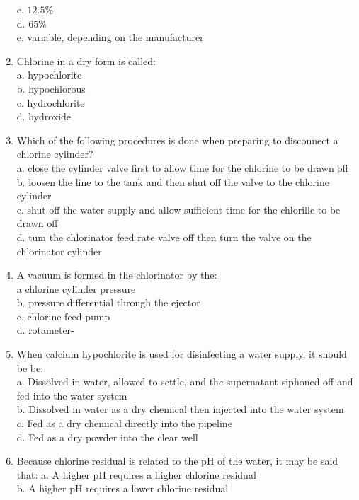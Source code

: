 \begin{enumerate}[1.]
c. $12.5 \%$\\
d. $65 \%$\\
e. variable, depending on the manufacturer\\
\item Chlorine in a dry form is called:\\
a. hypochlorite\\
b. hypochlorous\\
c. hydrochlorite\\
d. hydroxide\\
\item Which of the following procedures is done when preparing to disconnect a chlorine cylinder?\\
a. close the cylinder valve first to allow time for the chlorine to be drawn off\\
b. loosen the line to the tank and then shut off the valve to the chlorine cylinder\\
c. shut off the water supply and allow sufficient time for the chlorille to be drawn off\\
d. tum the chlorinator feed rate valve off then turn the valve on the chlorinator cylinder\\
\item A vacuum is formed in the chlorinator by the:\\
a chlorine cylinder pressure\\
b. pressure differential through the ejector\\
c. chlorine feed pump\\
d. rotameter-\\
\item When calcium hypochlorite is used for disinfecting a water supply, it should be be:\\
a. Dissolved in water, allowed to settle, and the supernatant siphoned off and fed into the water system\\
b. Dissolved in water as a dry chemical then injected into the water system\\
c. Fed as a dry chemical directly into the pipeline\\
d. Fed as a dry powder into the clear well\\
\item Because chlorine residual is related to the $\mathrm{pH}$ of the water, it may be said that: a. A higher $\mathrm{pH}$ requires a higher chlorine residual\\
b. A higher $\mathrm{pH}$ requires a lower chlorine residual\\

\end{enumerate}

